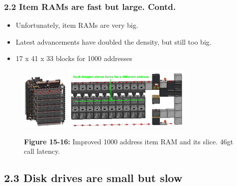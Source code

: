 \documentclass[aspectratio=169]{beamer}
\begin{document}
\begin{frame}
	\frametitle{2.2 Item RAMs are fast but large. Contd.}

    \begin{itemize}
		\item Unfortunately, item RAMs are very big.
		\item Latest advancements have doubled the density, but still too big.
		\item 17 x 41 x 33 blocks for 1000 addresses
	\end{itemize}
    \begin{figure}
        \includegraphics[width=0.2\textwidth]{bigram.png}
        \includegraphics[width=0.55\textwidth]{bigramslice.png}
        \caption{\textbf{Figure 15-16:} Improved 1000 address item RAM and its slice. 46gt call latency.}
	
    \end{figure}
\end{frame}

\subsection{2.3 Disk drives are small but slow}
\end{document}
